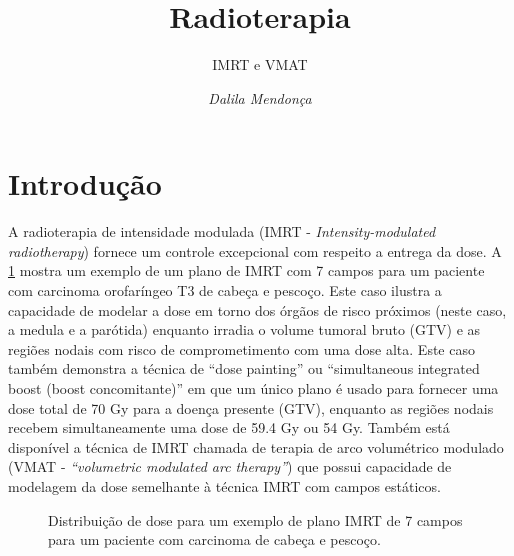 \documentclass[11pt,a4paper]{article}
\title{\LobsterTwo\Huge{Radioterapia}}
\author{\LobsterTwo\Large{IMRT e VMAT}\nocite{*}}
\date{\LobsterTwo\textit{Dalila Mendonça}}
\newcounter{exemplo}
\begin{document}
	\maketitle

\thispagestyle{fancy}
\section{Introdução}

	A radioterapia de intensidade modulada (IMRT - \textit{Intensity-modulated radiotherapy}) fornece um controle excepcional com respeito a entrega da dose. A \ref{fig:imrt7campos} mostra um exemplo de um plano de IMRT com 7 campos para um paciente com carcinoma orofaríngeo T3 de cabeça e pescoço. Este caso ilustra a capacidade de modelar a dose em torno dos órgãos de risco próximos (neste caso, a medula e a parótida) enquanto irradia o volume tumoral bruto (GTV) e as regiões nodais com risco de comprometimento com uma dose alta. Este caso também demonstra a técnica de “dose painting” ou “simultaneous integrated boost (boost concomitante)” em que um único plano é usado para fornecer uma dose total de 70 Gy para a doença presente (GTV), enquanto as regiões nodais recebem simultaneamente uma dose de 59.4 Gy ou 54 Gy. Também está disponível a técnica de IMRT chamada de terapia de arco volumétrico modulado (VMAT - \textit{``volumetric modulated arc therapy''})  que possui capacidade de modelagem da dose semelhante à técnica IMRT com campos estáticos.

	\begin{figure}[h]
		\centering
		\caption{Distribuição de dose para um exemplo de plano IMRT de 7 campos para um paciente com carcinoma de cabeça e pescoço.}
		\label{fig:imrt7campos}
	\end{figure}
\end{document}
